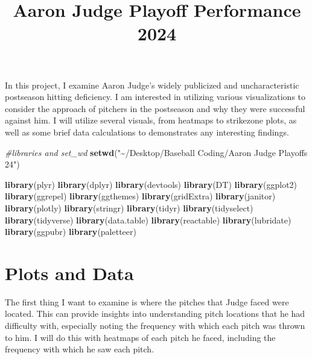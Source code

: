 \documentclass[
]{article}
\title{Aaron Judge Playoff Performance 2024}
\author{}
\date{\vspace{-2.5em}}
\newenvironment{Shaded}{\begin{snugshade}}{\end{snugshade}}
\newcommand{\CommentTok}[1]{\textcolor[rgb]{0.56,0.35,0.01}{\textit{#1}}}
\newcommand{\FunctionTok}[1]{\textcolor[rgb]{0.13,0.29,0.53}{\textbf{#1}}}
\newcommand{\NormalTok}[1]{#1}
\newcommand{\StringTok}[1]{\textcolor[rgb]{0.31,0.60,0.02}{#1}}
\begin{document}
\maketitle

In this project, I examine Aaron Judge's widely publicized and
uncharacteristic postseason hitting deficiency. I am interested in
utilizing various visualizations to consider the approach of pitchers in
the postseason and why they were successful against him. I will utilize
several visuals, from heatmaps to strikezone plots, as well as some
brief data calculations to demonstrates any interesting findings.

\begin{Shaded}
\begin{Highlighting}[]
\CommentTok{\#libraries and set\_wd}
\FunctionTok{setwd}\NormalTok{(}\StringTok{"\textasciitilde{}/Desktop/Baseball Coding/Aaron Judge Playoffs 24"}\NormalTok{)}

\FunctionTok{library}\NormalTok{(plyr)}
\FunctionTok{library}\NormalTok{(dplyr)}
\FunctionTok{library}\NormalTok{(devtools)}
\FunctionTok{library}\NormalTok{(DT)}
\FunctionTok{library}\NormalTok{(ggplot2)}
\FunctionTok{library}\NormalTok{(ggrepel)}
\FunctionTok{library}\NormalTok{(ggthemes)}
\FunctionTok{library}\NormalTok{(gridExtra)}
\FunctionTok{library}\NormalTok{(janitor)}
\FunctionTok{library}\NormalTok{(plotly)}
\FunctionTok{library}\NormalTok{(stringr)}
\FunctionTok{library}\NormalTok{(tidyr)}
\FunctionTok{library}\NormalTok{(tidyselect)}
\FunctionTok{library}\NormalTok{(tidyverse)}
\FunctionTok{library}\NormalTok{(data.table)}
\FunctionTok{library}\NormalTok{(reactable)}
\FunctionTok{library}\NormalTok{(lubridate)}
\FunctionTok{library}\NormalTok{(ggpubr)}
\FunctionTok{library}\NormalTok{(paletteer)}
\end{Highlighting}
\end{Shaded}

\section{Plots and Data}\label{plots-and-data}

The first thing I want to examine is where the pitches that Judge faced
were located. This can provide insights into understanding pitch
locations that he had difficulty with, especially noting the frequency
with which each pitch was thrown to him. I will do this with heatmaps of
each pitch he faced, including the frequency with which he saw each
pitch.
\end{document}
